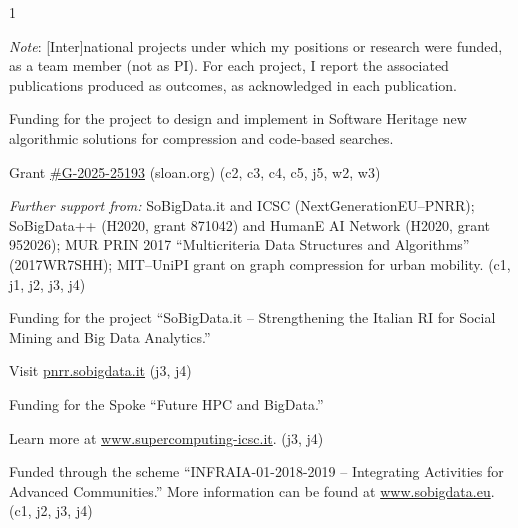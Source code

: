 \documentclass[10pt,a4paper,ragged2e,academicons]{altacv}
\newif\ifshortcv
\begin{document}
\begin{paracol}{1}

\smallskip


{\em Note}: [Inter]national projects under which my positions or research were funded, as a team member (not as PI). For each project, I report the associated publications produced as outcomes, as acknowledged in each publication.

\divider

Funding for the project to design and implement in Software Heritage new algorithmic solutions for compression and code-based searches.

Grant \href{https://sloan.org/grant-detail/g-2025-25193}{\#G-2025-25193} (sloan.org) (c2, c3, c4, c5, j5, w2, w3)

\divider

\ifshortcv
{\small\textit{Further support from:} SoBigData.it and ICSC (NextGenerationEU--PNRR); SoBigData++ (H2020, grant 871042) and HumanE AI Network (H2020, grant 952026); MUR PRIN 2017 ``Multicriteria Data Structures and Algorithms'' (2017WR7SHH); MIT--UniPI grant on graph compression for urban mobility. (c1, j1, j2, j3, j4)\par}
\else%
Funding for the project ``SoBigData.it -- Strengthening the Italian RI for Social Mining and Big Data Analytics.''

Visit \href{https://pnrr.sobigdata.it/}{pnrr.sobigdata.it} (j3, j4)

\divider

Funding for the Spoke ``Future HPC and BigData.''

Learn more at \href{https://www.supercomputing-icsc.it/}{www.supercomputing-icsc.it}. (j3, j4)

\divider

Funded through the scheme ``INFRAIA-01-2018-2019 -- Integrating Activities for Advanced Communities.'' More information can be found at \href{http://www.sobigdata.eu}{www.sobigdata.eu}. (c1, j2, j3, j4)


\end{paracol}
\end{document}
